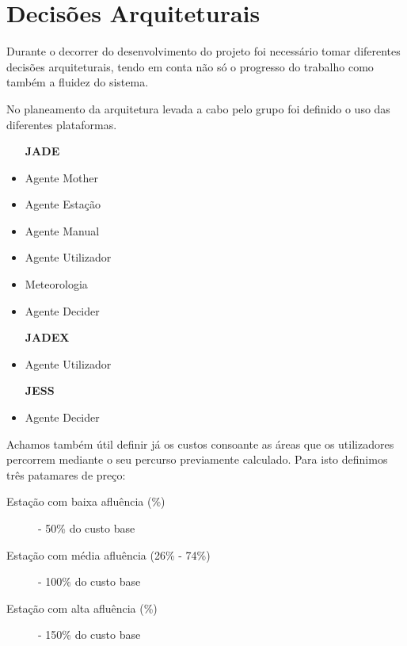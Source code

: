 \section{Decisões Arquiteturais}\label{sec:decisoes}

Durante o decorrer do desenvolvimento do projeto foi necessário tomar diferentes decisões arquiteturais, tendo em conta não só o progresso do trabalho como também a fluidez do sistema.

No planeamento da arquitetura levada a cabo pelo grupo foi definido o uso das diferentes plataformas.
\\
\begin{itemize}
\item [\textbf{JADE}]
	\item Agente Mother
	\item Agente Estação
	\item Agente Manual
	\item Agente Utilizador
	\item Meteorologia
	\item Agente Decider
\\
\item [\textbf{JADEX}]
	\item Agente Utilizador
\\
\item [\textbf{JESS}]
	\item Agente Decider
\end{itemize}
\vspace{5mm}
Achamos também útil definir já os custos consoante as áreas que os utilizadores percorrem mediante o seu percurso previamente calculado.
Para isto definimos três patamares de preço:
\begin{description}
	\item [Estação com baixa afluência (\%)] - 50\% do custo base
	\item [Estação com média afluência (26\% - 74\%)] - 100\% do custo base
	\item [Estação com alta afluência (\%)] - 150\% do custo base
\end{description}
\vspace{5mm}


